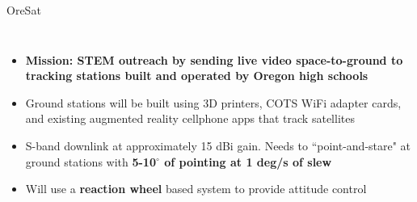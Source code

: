 \documentclass[slidestop,compress]{beamer}
\begin{document}
\begin{frame}[plain]
\begin{block}{\vspace{0.5 cm}

\centering OreSat}
\begin{columns}
\begin{itemize}
\item {\bf Mission: STEM outreach by sending live video space-to-ground to tracking stations built and operated by Oregon high schools}
\item Ground stations will be built using 3D printers, COTS WiFi adapter cards, and existing augmented reality cellphone apps that track satellites
\item S-band downlink at approximately 15 dBi gain. Needs to ``point-and-stare" at ground stations with {\bf 5-10$^{\circ}$ of pointing at 1 deg/s of slew}
\item Will use a {\bf{reaction wheel}} based system to provide attitude control

\end{itemize}
\end{columns}

\vspace{0.5 cm}
\end{block}    
\end{frame}
\end{document}
